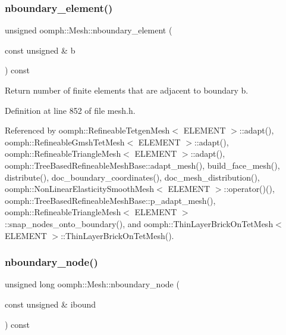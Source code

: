 \mbox{\label{classoomph_1_1Mesh_a68e04b3b70cff70d53d75f66661555e8}} 
\subsubsection{\texorpdfstring{nboundary\+\_\+element()}{nboundary\_element()}}
{\footnotesize\ttfamily unsigned oomph\+::\+Mesh\+::nboundary\+\_\+element (\begin{DoxyParamCaption}\item[{const unsigned \&}]{b }\end{DoxyParamCaption}) const\hspace{0.3cm}{\ttfamily [inline]}}



Return number of finite elements that are adjacent to boundary b. 



Definition at line 852 of file mesh.\+h.



Referenced by oomph\+::\+Refineable\+Tetgen\+Mesh$<$ E\+L\+E\+M\+E\+N\+T $>$\+::adapt(), oomph\+::\+Refineable\+Gmsh\+Tet\+Mesh$<$ E\+L\+E\+M\+E\+N\+T $>$\+::adapt(), oomph\+::\+Refineable\+Triangle\+Mesh$<$ E\+L\+E\+M\+E\+N\+T $>$\+::adapt(), oomph\+::\+Tree\+Based\+Refineable\+Mesh\+Base\+::adapt\+\_\+mesh(), build\+\_\+face\+\_\+mesh(), distribute(), doc\+\_\+boundary\+\_\+coordinates(), doc\+\_\+mesh\+\_\+distribution(), oomph\+::\+Non\+Linear\+Elasticity\+Smooth\+Mesh$<$ E\+L\+E\+M\+E\+N\+T $>$\+::operator()(), oomph\+::\+Tree\+Based\+Refineable\+Mesh\+Base\+::p\+\_\+adapt\+\_\+mesh(), oomph\+::\+Refineable\+Triangle\+Mesh$<$ E\+L\+E\+M\+E\+N\+T $>$\+::snap\+\_\+nodes\+\_\+onto\+\_\+boundary(), and oomph\+::\+Thin\+Layer\+Brick\+On\+Tet\+Mesh$<$ E\+L\+E\+M\+E\+N\+T $>$\+::\+Thin\+Layer\+Brick\+On\+Tet\+Mesh().

\mbox{\label{classoomph_1_1Mesh_a034677ceb48c67769acb83f304c84f7d}} 
\subsubsection{\texorpdfstring{nboundary\+\_\+node()}{nboundary\_node()}}
{\footnotesize\ttfamily unsigned long oomph\+::\+Mesh\+::nboundary\+\_\+node (\begin{DoxyParamCaption}\item[{const unsigned \&}]{ibound }\end{DoxyParamCaption}) const\hspace{0.3cm}{\ttfamily [inline]}}



